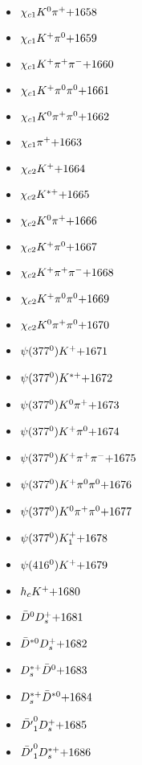 \begin{multicols}{3}
\begin{itemize}
 \item $ \chi_{c1} K^{0} \pi^{+} \hfill{+1658}$
 \item $ \chi_{c1} K^{+} \pi^{0} \hfill{+1659}$
 \item $ \chi_{c1} K^{+} \pi^{+} \pi^{-} \hfill{+1660}$
 \item $ \chi_{c1} K^{+} \pi^{0} \pi^{0} \hfill{+1661}$
 \item $ \chi_{c1} K^{0} \pi^{+} \pi^{0} \hfill{+1662}$
 \item $ \chi_{c1} \pi^{+} \hfill{+1663}$
 \item $ \chi_{c2} K^{+} \hfill{+1664}$
 \item $ \chi_{c2} K^{*+} \hfill{+1665}$
 \item $ \chi_{c2} K^{0} \pi^{+} \hfill{+1666}$
 \item $ \chi_{c2} K^{+} \pi^{0} \hfill{+1667}$
 \item $ \chi_{c2} K^{+} \pi^{+} \pi^{-} \hfill{+1668}$
 \item $ \chi_{c2} K^{+} \pi^{0} \pi^{0} \hfill{+1669}$
 \item $ \chi_{c2} K^{0} \pi^{+} \pi^{0} \hfill{+1670}$
 \item $ \psi(377^{0}) K^{+} \hfill{+1671}$
 \item $ \psi(377^{0}) K^{*+} \hfill{+1672}$
 \item $ \psi(377^{0}) K^{0} \pi^{+} \hfill{+1673}$
 \item $ \psi(377^{0}) K^{+} \pi^{0} \hfill{+1674}$
 \item $ \psi(377^{0}) K^{+} \pi^{+} \pi^{-} \hfill{+1675}$
 \item $ \psi(377^{0}) K^{+} \pi^{0} \pi^{0} \hfill{+1676}$
 \item $ \psi(377^{0}) K^{0} \pi^{+} \pi^{0} \hfill{+1677}$
 \item $ \psi(377^{0}) K_{1}^{+} \hfill{+1678}$
 \item $ \psi(416^{0}) K^{+} \hfill{+1679}$
 \item $ h_{c} K^{+} \hfill{+1680}$
 \item $ \bar{D}^{0} D_{s}^{+} \hfill{+1681}$
 \item $ \bar{D}^{*0} D_{s}^{+} \hfill{+1682}$
 \item $ D_{s}^{*+} \bar{D}^{0} \hfill{+1683}$
 \item $ D_{s}^{*+} \bar{D}^{*0} \hfill{+1684}$
 \item $ \bar{{D^{\prime}}}_{1}^{0} D_{s}^{+} \hfill{+1685}$
 \item $ \bar{{D^{\prime}}}_{1}^{0} D_{s}^{*+} \hfill{+1686}$

\end{itemize}
\end{multicols}
